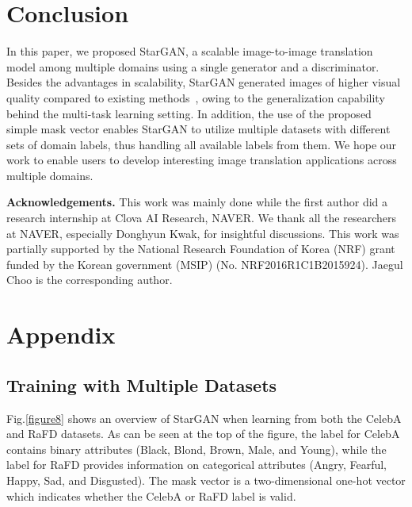 \documentclass[10pt,twocolumn,letterpaper]{article}
\begin{document}

\section{Conclusion} \label{conclusion}

In this paper, we proposed StarGAN, a scalable image-to-image translation model among multiple domains using a single generator and a discriminator. Besides the advantages in scalability, StarGAN generated images of higher visual quality compared to existing methods~\cite{li2016deep,perarnau2016invertible,zhu2017unpaired}, owing to the generalization capability behind the multi-task learning setting. In addition, the use of the proposed simple mask vector enables StarGAN to utilize multiple datasets with different sets of domain labels, thus handling all available labels from them. We hope our work to enable users to develop interesting image translation applications across multiple domains. %

\vspace{7px}

\noindent\textbf{Acknowledgements.} This work was mainly done while the first author did a research internship at Clova AI Research, NAVER. We thank all the researchers at NAVER, especially Donghyun Kwak, for insightful discussions. This work was partially supported by the National Research Foundation of Korea
(NRF) grant funded by the Korean government (MSIP) (No. NRF2016R1C1B2015924). Jaegul Choo is the corresponding author.


{\small


}
\vspace{10in}
\onecolumn
\section{Appendix} \label{appendix}
\subsection{Training with Multiple Datasets} 
Fig.\thinspace\ref{figure8} shows an overview of StarGAN when learning from both the CelebA and RaFD datasets. As can be seen at the top of the figure, the label for CelebA contains binary attributes (Black, Blond, Brown, Male, and Young), while the label for RaFD provides information on categorical attributes (Angry, Fearful, Happy, Sad, and Disgusted). The mask vector is a two-dimensional one-hot vector which indicates whether the CelebA or RaFD label is valid.
\end{document}

